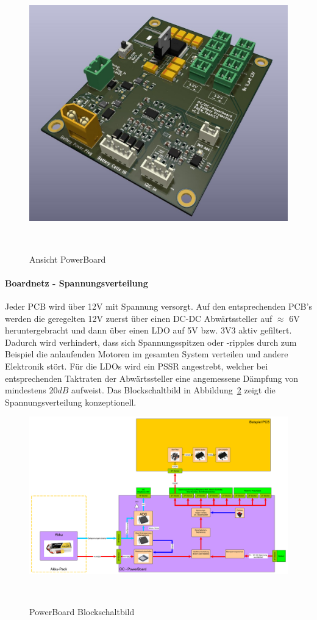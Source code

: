 \documentclass[main.tex]{subfiles} %
\begin{document}
\begin{figure}[H]
    \centering
    \includegraphics[width = 0.75\linewidth]{fig_Boardnetz/PowerDistributionBoard.jpg}
    \caption{Ansicht PowerBoard}~\label{PowerBoard_Ansicht}
\end{figure}

\paragraph{Boardnetz - Spannungsverteilung}
Jeder PCB wird über 12V mit Spannung versorgt. Auf den entsprechenden PCB's
werden die geregelten 12V zuerst über einen DC-DC Abwärtssteller auf $\approx$
6V heruntergebracht und dann über einen LDO auf 5V bzw. 3V3 aktiv gefiltert.
Dadurch wird verhindert, dass sich Spannungsspitzen oder -ripples durch zum
Beispiel die anlaufenden Motoren im gesamten System verteilen und andere
Elektronik stört. Für die LDOs wird ein PSSR angestrebt, welcher bei
entsprechenden Taktraten der Abwärtssteller eine angemessene Dämpfung von
mindestens $20dB$ aufweist. Das Blockschaltbild in
Abbildung~\ref{PowerBoard_Blockschaltbild} zeigt die Spannungsverteilung
konzeptionell.

\begin{figure}[H]
    \centering
    \includegraphics[width = 1\linewidth]{fig_Boardnetz/PowerBoard-Blockschaltbild.pdf}
    \caption{PowerBoard Blockschaltbild}~\label{PowerBoard_Blockschaltbild}
\end{figure}
\end{document}
